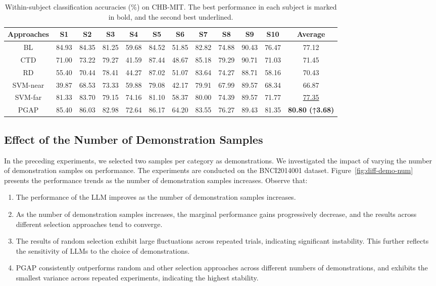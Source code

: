 \documentclass[journal,twocolumn]{IEEEtran}
\begin{document}
\begin{table}[htpb] \centering
  \caption{Within-subject classification accuracies (\%) on CHB-MIT. The best performance in each subject is marked in bold, and the second best underlined.}
  \label{tab:chb-mit-result}
  \begin{tabular}{c|c|c|c|c|c|c|c|c|c|c|c}
  \toprule
  Approaches & S1 & S2 & S3 & S4 & S5 & S6 & S7 & S8 & S9 & S10 & Average \\
  \midrule
  BL & 84.93 & 84.35 & 81.25 & 59.68 & 84.52 & 51.85 & 82.82 & 74.88 & 90.43 & 76.47 & 77.12 \\
  CTD & 71.00 & 73.22 & 79.27 & 41.59 & 87.44 & 48.67 & 85.18 & 79.29 & 90.71 & 71.03 & 71.45 \\
  RD & 55.40 & 70.44 & 78.41 & 44.27 & 87.02 & 51.07 & 83.64 & 74.27 & 88.71 & 58.16 & 70.43 \\
  SVM-near & 39.87 & 68.53 & 73.33 & 59.88 & 79.08 & 42.17 & 79.91 & 67.99 & 89.57 & 68.34 & 66.87 \\
  SVM-far & 81.33 & 83.70 & 79.15 & 74.16 & 81.10 & 58.37 & 80.00 & 74.39 & 89.57 & 71.77 & \underline{77.35} \\
  PGAP & 85.40 & 86.03 & 82.98 & 72.64 & 86.17 & 64.20 & 83.55 & 76.27 & 89.43 & 81.35 & \textbf{80.80 (↑3.68)} \\
  \bottomrule
  \end{tabular}
\end{table}

\subsection{Effect of the Number of Demonstration Samples}
In the preceding experiments, we selected two samples per category as demonstrations. We investigated the impact of varying the number of demonstration samples on performance. The experiments are conducted on the BNCI2014001 dataset. Figure~\ref{fig:diff-demo-num} presents the performance trends as the number of demonstration samples increases. Observe that:

\begin{enumerate}
  \item The performance of the LLM improves as the number of demonstration samples increases.
  \item As the number of demonstration samples increases, the marginal performance gains progressively decrease, and the results across different selection approaches tend to converge.
  \item The results of random selection exhibit large fluctuations across repeated trials, indicating significant instability. This further reflects the sensitivity of LLMs to the choice of demonstrations.
  \item PGAP consistently outperforms random and other selection approaches across different numbers of demonstrations, and exhibits the smallest variance across repeated experiments, indicating the highest stability.
\end{enumerate}
\end{document}
